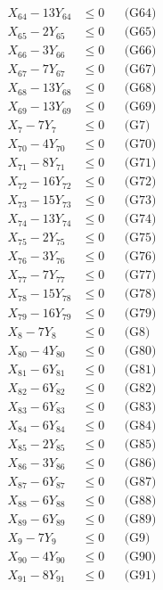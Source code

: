 \documentclass[a4paper,10pt]{article}
\begin{document}
{\begin{align}
X_{64} - 13Y_{64} &\leq 0 && \text{(G64)} \\
X_{65} - 2Y_{65} &\leq 0 && \text{(G65)} \\
X_{66} - 3Y_{66} &\leq 0 && \text{(G66)} \\
X_{67} - 7Y_{67} &\leq 0 && \text{(G67)} \\
X_{68} - 13Y_{68} &\leq 0 && \text{(G68)} \\
X_{69} - 13Y_{69} &\leq 0 && \text{(G69)} \\
X_{7} - 7Y_{7} &\leq 0 && \text{(G7)} \\
X_{70} - 4Y_{70} &\leq 0 && \text{(G70)} \\
X_{71} - 8Y_{71} &\leq 0 && \text{(G71)} \\
X_{72} - 16Y_{72} &\leq 0 && \text{(G72)} \\
X_{73} - 15Y_{73} &\leq 0 && \text{(G73)} \\
X_{74} - 13Y_{74} &\leq 0 && \text{(G74)} \\
X_{75} - 2Y_{75} &\leq 0 && \text{(G75)} \\
X_{76} - 3Y_{76} &\leq 0 && \text{(G76)} \\
X_{77} - 7Y_{77} &\leq 0 && \text{(G77)} \\
X_{78} - 15Y_{78} &\leq 0 && \text{(G78)} \\
X_{79} - 16Y_{79} &\leq 0 && \text{(G79)} \\
X_{8} - 7Y_{8} &\leq 0 && \text{(G8)} \\
X_{80} - 4Y_{80} &\leq 0 && \text{(G80)} \\
\allowbreak
X_{81} - 6Y_{81} &\leq 0 && \text{(G81)} \\
X_{82} - 6Y_{82} &\leq 0 && \text{(G82)} \\
X_{83} - 6Y_{83} &\leq 0 && \text{(G83)} \\
X_{84} - 6Y_{84} &\leq 0 && \text{(G84)} \\
X_{85} - 2Y_{85} &\leq 0 && \text{(G85)} \\
X_{86} - 3Y_{86} &\leq 0 && \text{(G86)} \\
X_{87} - 6Y_{87} &\leq 0 && \text{(G87)} \\
X_{88} - 6Y_{88} &\leq 0 && \text{(G88)} \\
X_{89} - 6Y_{89} &\leq 0 && \text{(G89)} \\
X_{9} - 7Y_{9} &\leq 0 && \text{(G9)} \\
X_{90} - 4Y_{90} &\leq 0 && \text{(G90)} \\
X_{91} - 8Y_{91} &\leq 0 && \text{(G91)} \\

\end{align}}
\end{document}
